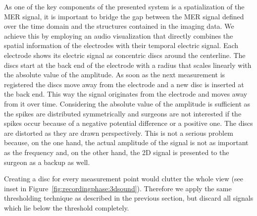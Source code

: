 \documentclass[review]{vgtc}                 %
\begin{document}
As one of the key components of the presented system is a spatialization of the MER signal, it is important to bridge the gap between the MER signal defined over the time domain and the structures contained in the imaging data. We achieve this by employing an audio visualization that directly combines the spatial information of the electrodes with their temporal electric signal. Each electrode shows its electric signal as concentric discs around the centerline. The discs start at the back end of the electrode with a radius that scales linearly with the absolute value of the amplitude. As soon as the next measurement is registered the discs move away from the electrode and a new disc is inserted at the back end. This way the signal originates from the electrode and moves away from it over time. Considering the absolute value of the amplitude is sufficient as the spikes are distributed symmetrically and surgeons are not interested if the spikes occur because of a negative potential difference or a positive one. The discs are distorted as they are drawn perspectively. This is not a serious problem because, on the one hand, the actual amplitude of the signal is not as important as the frequency and, on the other hand, the 2D signal is presented to the surgeon as a backup as well.

Creating a disc for every measurement point would clutter the whole view (see inset in Figure~\ref{fig:recordingphase:3dsound}). Therefore we apply the same thresholding technique as described in the previous section, but discard all signals which lie below the threshold completely.

\end{document}

